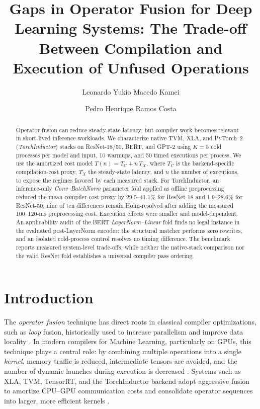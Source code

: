 \documentclass[sigconf]{acmart}
\title{Gaps in Operator Fusion for Deep Learning Systems: The Trade-off Between Compilation and Execution of Unfused Operations}
\author[L. Kamei]{Leonardo Yukio Macedo Kamei}
\affiliation{%
  \institution{PUC-MG}
  \city{Belo Horizonte}
  \country{Brazil}}
\author[P. Costa]{Pedro Henrique Ramos Costa}
\affiliation{%
  \institution{PUC-MG}
  \city{Belo Horizonte}
  \country{Brazil}}
\begin{document}
\begin{abstract}
Operator fusion can reduce steady-state latency, but compiler work becomes relevant in short-lived inference workloads. We characterize native TVM, XLA, and PyTorch~2 (\textit{TorchInductor}) stacks on ResNet-18/50, BERT, and GPT-2 using \(K=5\) cold processes per model and input, 10 warmups, and 50 timed executions per process. We use the amortized cost model $T(n)=T_C+n\,T_X$, where $T_C$ is the backend-specific compilation-cost proxy, $T_X$ the steady-state latency, and $n$ the number of executions, to expose the regimes favored by each measured stack. For TorchInductor, an inference-only \textit{Conv--BatchNorm} parameter fold applied as offline preprocessing reduced the mean compiler-cost proxy by 29.5--41.1\% for ResNet-18 and 1.9--28.6\% for ResNet-50; nine of ten differences remain Holm-resolved after adding the measured 100--120-ms preprocessing cost. Execution effects were smaller and model-dependent. An applicability audit of the BERT \textit{LayerNorm--Linear} fold finds no legal instance in the evaluated post-LayerNorm encoder: the structural matcher performs zero rewrites, and an isolated cold-process control resolves no timing difference. The benchmark reports measured system-level trade-offs, while neither the native-stack comparison nor the valid ResNet fold establishes a universal compiler pass ordering.
\end{abstract}


\maketitle


\section{Introduction}
The \emph{operator fusion} technique has direct roots in classical compiler optimizations, such as \emph{loop} fusion, historically used to increase parallelism and improve data locality \cite{wolf1991wolf}. In modern compilers for Machine Learning, particularly on GPUs, this technique plays a central role: by combining multiple operations into a single \emph{kernel}, memory traffic is reduced, intermediate tensors are avoided, and the number of dynamic launches during execution is decreased \cite{chen2018tvm,liu2021dnnfusion}. Systems such as XLA, TVM, TensorRT, and the TorchInductor backend adopt aggressive fusion to amortize CPU--GPU communication costs and consolidate operator sequences into larger, more efficient kernels \cite{xla2017leary,chen2018tvm,pytorch2022}.
\end{document}

